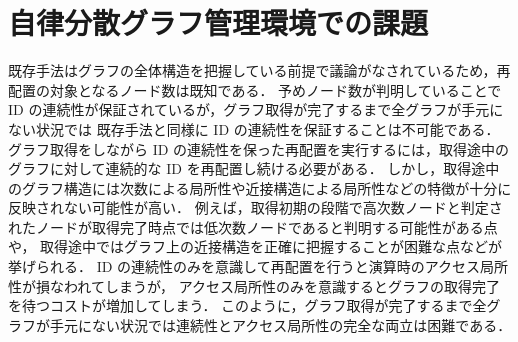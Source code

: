 \section{自律分散グラフ管理環境での課題}
既存手法はグラフの全体構造を把握している前提で議論がなされているため，再配置の対象となるノード数は既知である．
予めノード数が判明していることで ID の連続性が保証されているが，グラフ取得が完了するまで全グラフが手元にない状況では
既存手法と同様に ID の連続性を保証することは不可能である．
グラフ取得をしながら ID の連続性を保った再配置を実行するには，取得途中のグラフに対して連続的な ID を再配置し続ける必要がある．
しかし，取得途中のグラフ構造には次数による局所性や近接構造による局所性などの特徴が十分に反映されない可能性が高い．
例えば，取得初期の段階で高次数ノードと判定されたノードが取得完了時点では低次数ノードであると判明する可能性がある点や，
取得途中ではグラフ上の近接構造を正確に把握することが困難な点などが挙げられる．
ID の連続性のみを意識して再配置を行うと演算時のアクセス局所性が損なわれてしまうが，
アクセス局所性のみを意識するとグラフの取得完了を待つコストが増加してしまう．
このように，グラフ取得が完了するまで全グラフが手元にない状況では連続性とアクセス局所性の完全な両立は困難である．